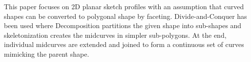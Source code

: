 This paper focuses on 2D planar sketch profiles with an assumption that curved shapes can be converted to polygonal shape by faceting. Divide-and-Conquer has been used where Decomposition partitions the given shape into sub-shapes and skeletonization creates the midcurves in simpler sub-polygons.  At the end, individual midcurves are extended and joined to form a continuous set of curves mimicking the parent shape.

